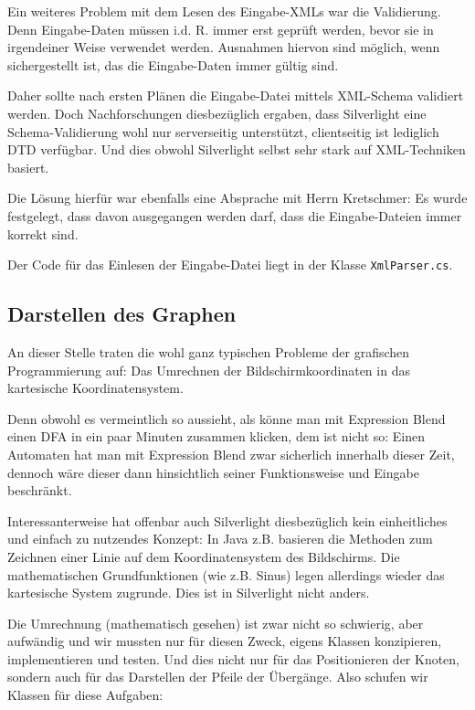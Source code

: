 Ein weiteres Problem mit dem Lesen des Eingabe-XMLs war die Validierung. Denn
Eingabe-Daten müssen i.d. R. immer erst geprüft werden, bevor sie in
irgendeiner Weise verwendet werden. Ausnahmen hiervon sind möglich, wenn
sichergestellt ist, das die Eingabe-Daten immer gültig sind.

Daher sollte nach ersten Plänen die Eingabe-Datei mittels XML-Schema validiert
werden. Doch Nachforschungen diesbezüglich ergaben, dass Silverlight eine
Schema-Validierung wohl nur serverseitig unterstützt, clientseitig ist
lediglich DTD verfügbar. Und dies obwohl Silverlight selbst sehr stark auf
XML-Techniken basiert.

Die Lösung hierfür war ebenfalls eine Absprache mit Herrn Kretschmer: Es wurde
festgelegt, dass davon ausgegangen werden darf, dass die Eingabe-Dateien immer
korrekt sind.

Der Code für das Einlesen der Eingabe-Datei liegt in der Klasse \texttt{XmlParser.cs}.

\subsection{Darstellen des Graphen}
An dieser Stelle traten die wohl ganz typischen Probleme der grafischen
Programmierung auf: Das Umrechnen der Bildschirmkoordinaten in das kartesische
Koordinatensystem.

Denn obwohl es vermeintlich so aussieht, als könne man mit Expression Blend
einen DFA in ein paar Minuten zusammen klicken, dem ist nicht so: Einen
Automaten hat man mit Expression Blend zwar sicherlich innerhalb dieser Zeit,
dennoch wäre dieser dann hinsichtlich seiner Funktionsweise und Eingabe
beschränkt.

Interessanterweise hat offenbar auch Silverlight diesbezüglich kein
einheitliches und einfach zu nutzendes Konzept: In Java z.B. basieren die
Methoden zum Zeichnen einer Linie auf dem Koordinatensystem des Bildschirms.
Die mathematischen Grundfunktionen (wie z.B. Sinus) legen allerdings wieder das
kartesische System zugrunde. Dies ist in Silverlight nicht anders.

Die Umrechnung (mathematisch gesehen) ist zwar nicht so schwierig, aber
aufwändig und wir mussten nur für diesen Zweck, eigens Klassen konzipieren,
implementieren und testen. Und dies nicht nur für das Positionieren der Knoten,
sondern auch für das Darstellen der Pfeile der Übergänge. Also schufen wir
Klassen für diese Aufgaben:

